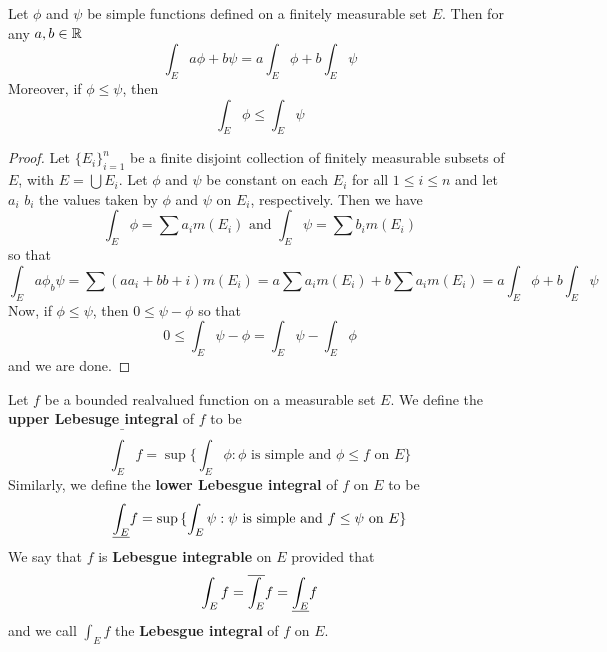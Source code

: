 \begin{lemma}\label{10.1.2}
    Let $\phi$ and  $\psi$ be simple functions defined on a finitely measurable
    set $E$. Then for any $a,b \in \mathbb{R}$
    \begin{equation*}
        \int_E{a\phi+b\psi}=a\int_E{\phi}+b\int_E{\psi}
    \end{equation*}
    Moreover, if $\phi \leq \psi$, then
    \begin{equation*}
        \int_E{\phi} \leq \int_E{\psi}
    \end{equation*}
\end{lemma}
\begin{proof}
    Let $\{E_i\}_{i=1}^n$ be a finite disjoint collection of finitely measurable
    subsets of $E$, with  $E=\bigcup{E_i}$. Let $\phi$ and  $\psi$ be constant
    on each  $E_i$ for all $1 \leq i \leq n$ and let $a_i$  $b_i$ the values
    taken by  $\phi$ and  $\psi$ on  $E_i$, respectively. Then we have
    \begin{equation*}
        \int_E{\phi}=\sum{a_im(E_i)} \text{ and } \int_E{\psi}=\sum{b_im(E_i)}
    \end{equation*}
    so that
    \begin{equation*}
        \int_E{a\phi_b\psi}=\sum{(aa_i+bb+i)m(E_i)}=a\sum{a_im(E_i)}+b\sum{a_im(E_i)}
        =a\int_E{\phi}+b\int_E{\psi}
    \end{equation*}
    Now, if $\phi \leq \psi$, then  $0 \leq \psi-\phi$ so that
    \begin{equation*}
        0 \leq \int_E{\psi-\phi}=\int_E{\psi}-\int_E{\phi}
    \end{equation*}
    and we are done.
\end{proof}

\begin{definition}
    Let $f$ be a bounded realvalued function on a measurable set $E$. We define
    the \textbf{upper Lebesuge integral} of $f$ to be
    \begin{equation*}
        \bar{\int_E}{f}=\sup{\{\int_E{\phi} : \phi \text{ is simple and } \phi
        \leq f \text{ on } E\}}
    \end{equation*}
    Similarly, we define the \textbf{lower Lebesgue integral} of $f$ on $E$ to
    be
    \begin{equation*}
        \underline{\int_E}{f}=\sup{\{\int_E{\psi} : \psi \text{ is simple and } f
        \leq \psi \text{ on } E\}}
    \end{equation*}
    We say that $f$ is \textbf{Lebesgue integrable} on $E$ provided that
    \begin{equation*}
        \int_E{f}=\overline{\int_E}{f}=\underline{\int_E}{f}
    \end{equation*}
    and we call $\int_E{f}$ the \textbf{Lebesgue integral} of $f$ on $E$.
\end{definition}

